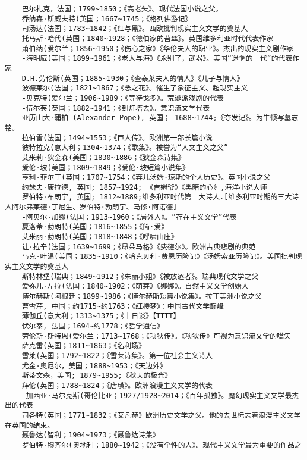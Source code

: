 \documentclass[UTF8]{../../RepresentationUniverse}
\begin{document}
\begin{lstlisting}
    巴尔扎克，法国；1799~1850；《高老头》。现代法国小说之父。
    乔纳森·斯威夫特(英国；1667~1745；《格列佛游记》
    司汤达(法国；1783~1842；《红与黑》。西欧批判现实主义文学的奠基人
    托马斯·哈代(英国；1840~1928；《德伯家的苔丝》。英国维多利亚时代代表作家
    萧伯纳(爱尔兰；1856~1950；《伤心之家》《华伦夫人的职业》。杰出的现实主义剧作家
    -海明威(美国；1899~1961；《老人与海》《永别了，武器》。美国“迷惘的一代”的代表作家
    D.H.劳伦斯(英国；1885~1930；《查泰莱夫人的情人》《儿子与情人》
    波德莱尔(法国；1821~1867；《恶之花》。催生了象征主义、超现实主义
    -贝克特(爱尔兰；1906~1989；《等待戈多》。荒诞派戏剧的代表
    -伍尔芙(英国；1882~1941；《到灯塔去》。意识流文学代表
    亚历山大·蒲柏 (Alexander Pope), 英国； 1688~1744;《夺发记》。为牛顿写墓志铭。
    拉伯雷(法国；1494~1553；《巨人传》。欧洲第一部长篇小说
    彼特拉克(意大利；1304~1374；《歌集》。被誉为“人文主义之父”
    艾米莉·狄金森(美国；1830~1886；《狄金森诗集》
    爱伦·坡(美国；1809~1849；《爱伦·坡短篇小说集》
    亨利·菲尔丁(英国；1707~1754；《弃儿汤姆·琼斯的个人历史》。英国小说之父
    约瑟夫·康拉德, 英国; 1857~1924; 《吉姆爷》《黑暗的心》,海洋小说大师
    罗伯特·布朗宁, 英国; 1812~1889;维多利亚时代第二大诗人.[维多利亚时期的三大诗人阿尔弗莱德·丁尼生、罗伯特·勃朗宁、马修·阿诺德]
    -阿贝尔·加缪(法国；1913~1960；《局外人》。“存在主义文学”代表
    夏洛蒂·勃朗特(英国；1816~1855；《简·爱》
    艾米丽·勃朗特(英国；1818~1848；《呼啸山庄》
    让·拉辛(法国；1639~1699；《昂朵马格》《费德尔》。欧洲古典悲剧的典范
    马克·吐温(美国；1835~1910；《哈克贝利·费恩历险记》《汤姆索亚历险记》。美国批判现实主义文学的奠基人
    斯特林堡(瑞典；1849~1912；《朱丽小姐》《被放逐者》。瑞典现代文学之父
    爱弥儿·左拉(法国；1840~1902；《萌芽》《娜娜》。自然主义文学创始人
    博尔赫斯(阿根廷；1899~1986；《博尔赫斯短篇小说集》。拉丁美洲小说之父
    曹雪芹, 中国；约1715~约1763；《红楼梦》：中国古代文学巅峰
    薄伽丘(意大利；1313~1375；《十日谈》【TTTT】
    伏尔泰, 法国；1694~约1778；《哲学通信》
    劳伦斯·斯特恩(爱尔兰；1713~1768；《项狄传》。《项狄传》可视为意识流文学的嚆矢
    萨克雷(英国；1811~1863；《名利场》
    雪莱(英国；1792~1822；《雪莱诗集》。第一位社会主义诗人
    尤金·奥尼尔，美国；1888~1953；《天边外》
    斯蒂文森，美国; 1879~1955;《秋天的极光》
    拜伦(英国；1788~1824；《唐璜》。欧洲浪漫主义文学的代表
    -加西亚·马尔克斯(哥伦比亚；1927/1928~2014；《百年孤独》。魔幻现实主义文学最杰出的代表
    司各特(英国；1771~1832；《艾凡赫》欧洲历史文学之父。他的去世标志着浪漫主义文学在英国的结束。
    聂鲁达(智利；1904~1973；《聂鲁达诗集》
    罗伯特·穆齐尔(奥地利；1880~1942；《没有个性的人》。现代主义文学最为重要的作品之一

\end{lstlisting}
\end{document}
